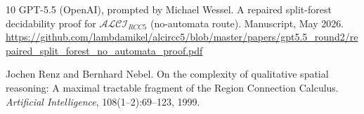\documentclass[a4paper,11pt]{article}
\theoremstyle{definition}
\begin{document}
\begin{thebibliography}{10}
GPT-5.5 (OpenAI), prompted by Michael Wessel.
\newblock A repaired split-forest decidability proof for
  $\mathcal{ALCI}_{RCC5}$ (no-automata route).
\newblock Manuscript, May 2026.
\newblock \url{https://github.com/lambdamikel/alcircc5/blob/master/papers/gpt5.5_round2/repaired_split_forest_no_automata_proof.pdf}

Jochen Renz and Bernhard Nebel.
\newblock On the complexity of qualitative spatial reasoning:
  A maximal tractable fragment of the Region Connection Calculus.
\newblock \emph{Artificial Intelligence}, 108(1--2):69--123, 1999.

\end{thebibliography}
\end{document}
